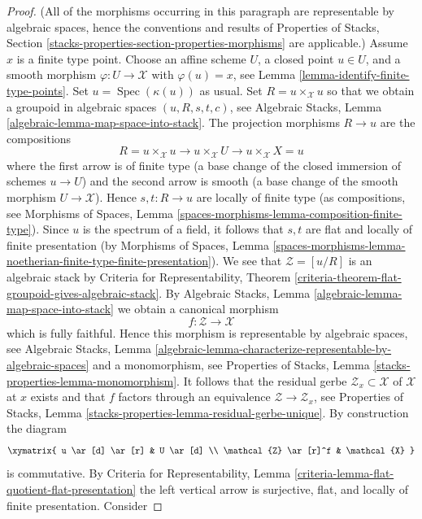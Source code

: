\documentclass{stacks-project}
\theoremstyle{plain}
\theoremstyle{definition}
\theoremstyle{remark}
\numberwithin{equation}{subsection}
\def\Spec{\mathop{\mathrm{Spec}}}
\begin{document}
\begin{proof}
(All of the morphisms occurring in this paragraph are representable
by algebraic spaces, hence the conventions and results of
Properties of Stacks,
Section \ref{stacks-properties-section-properties-morphisms}
are applicable.)
Assume $x$ is a finite type point. Choose an affine scheme $U$,
a closed point $u \in U$, and a smooth morphism $\varphi : U \to \mathcal{X}$
with $\varphi(u) = x$, see
Lemma \ref{lemma-identify-finite-type-points}.
Set $u = \Spec(\kappa(u))$ as usual. Set $R = u \times_\mathcal{X} u$
so that we obtain a groupoid in algebraic spaces
$(u, R, s, t, c)$, see
Algebraic Stacks, Lemma \ref{algebraic-lemma-map-space-into-stack}.
The projection morphisms $R \to u$ are the compositions
$$
R = u \times_\mathcal{X} u \to
u \times_\mathcal{X} U \to
u \times_\mathcal{X} X = u
$$
where the first arrow is of finite type (a base change of the closed
immersion of schemes $u \to U$) and the second arrow is smooth (a base
change of the smooth morphism $U \to \mathcal{X}$). Hence
$s, t : R \to u$ are locally of finite type (as compositions, see
Morphisms of Spaces,
Lemma \ref{spaces-morphisms-lemma-composition-finite-type}).
Since $u$ is the spectrum of a field, it follows that
$s, t$ are flat and locally of finite presentation (by
Morphisms of Spaces, Lemma
\ref{spaces-morphisms-lemma-noetherian-finite-type-finite-presentation}).
We see that $\mathcal{Z} = [u/R]$ is an algebraic stack by
Criteria for Representability,
Theorem \ref{criteria-theorem-flat-groupoid-gives-algebraic-stack}.
By
Algebraic Stacks, Lemma \ref{algebraic-lemma-map-space-into-stack}
we obtain a canonical morphism
$$
f : \mathcal{Z} \longrightarrow \mathcal{X}
$$
which is fully faithful. Hence this morphism is representable by
algebraic spaces, see
Algebraic Stacks, Lemma
\ref{algebraic-lemma-characterize-representable-by-algebraic-spaces}
and a monomorphism, see
Properties of Stacks, Lemma \ref{stacks-properties-lemma-monomorphism}.
It follows that the residual gerbe $\mathcal{Z}_x \subset \mathcal{X}$
of $\mathcal{X}$ at $x$ exists and that $f$ factors through an
equivalence $\mathcal{Z} \to \mathcal{Z}_x$, see
Properties of Stacks, Lemma
\ref{stacks-properties-lemma-residual-gerbe-unique}.
By construction the diagram
$$
\xymatrix{
u \ar[d] \ar[r] & U \ar[d] \\
\mathcal{Z} \ar[r]^f & \mathcal{X}
}
$$
is commutative. By
Criteria for Representability,
Lemma \ref{criteria-lemma-flat-quotient-flat-presentation}
the left vertical arrow is surjective, flat, and locally of finite
presentation. Consider

\end{proof}
\end{document}
